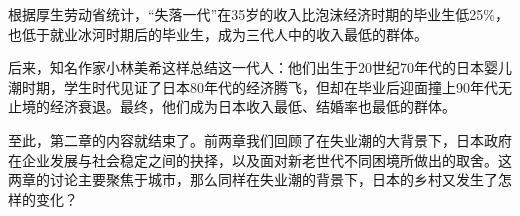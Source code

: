 根据厚生劳动省统计，“失落一代”在35岁的收入比泡沫经济时期的毕业生低25\%，也低于就业冰河时期后的毕业生，成为三代人中的收入最低的群体。

后来，知名作家小林美希这样总结这一代人：他们出生于20世纪70年代的日本婴儿潮时期，学生时代见证了日本80年代的经济腾飞，但却在毕业后迎面撞上90年代无止境的经济衰退。最终，他们成为日本收入最低、结婚率也最低的群体。

至此，第二章的内容就结束了。前两章我们回顾了在失业潮的大背景下，日本政府在企业发展与社会稳定之间的抉择，以及面对新老世代不同困境所做出的取舍。这两章的讨论主要聚焦于城市，那么同样在失业潮的背景下，日本的乡村又发生了怎样的变化？
